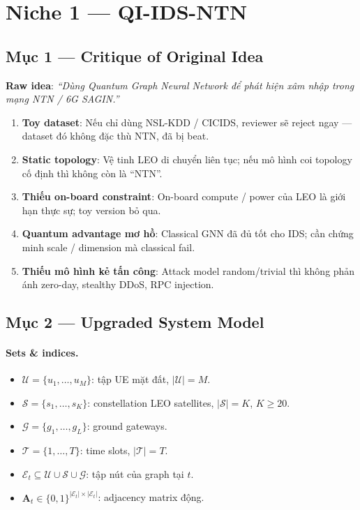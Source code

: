 \documentclass[11pt,a4paper]{article}
\begin{document}
\section{Niche 1 --- QI-IDS-NTN}

\subsection{Mục 1 --- Critique of Original Idea}

\textbf{Raw idea}: \textit{``Dùng Quantum Graph Neural Network để phát hiện xâm nhập trong mạng NTN / 6G SAGIN.''}

\begin{critique}
\begin{enumerate}
  \item \textbf{Toy dataset}: Nếu chỉ dùng NSL-KDD / CICIDS, reviewer sẽ reject ngay --- dataset đó không đặc thù NTN, đã bị beat.
  \item \textbf{Static topology}: Vệ tinh LEO di chuyển liên tục; nếu mô hình coi topology cố định thì không còn là ``NTN''.
  \item \textbf{Thiếu on-board constraint}: On-board compute / power của LEO là giới hạn thực sự; toy version bỏ qua.
  \item \textbf{Quantum advantage mơ hồ}: Classical GNN đã đủ tốt cho IDS; cần chứng minh scale / dimension mà classical fail.
  \item \textbf{Thiếu mô hình kẻ tấn công}: Attack model random/trivial thì không phản ánh zero-day, stealthy DDoS, RPC injection.
\end{enumerate}
\end{critique}

\subsection{Mục 2 --- Upgraded System Model}

\paragraph{Sets \& indices.}
\begin{itemize}
  \item $\mathcal{U} = \{u_1, \dots, u_M\}$: tập UE mặt đất, $|\mathcal{U}| = M$.
  \item $\mathcal{S} = \{s_1, \dots, s_K\}$: constellation LEO satellites, $|\mathcal{S}| = K$, $K \geq 20$.
  \item $\mathcal{G} = \{g_1, \dots, g_L\}$: ground gateways.
  \item $\mathcal{T} = \{1, \dots, T\}$: time slots, $|\mathcal{T}| = T$.
  \item $\mathcal{E}_t \subseteq \mathcal{U} \cup \mathcal{S} \cup \mathcal{G}$: tập nút của graph tại $t$.
  \item $\mathbf{A}_t \in \{0,1\}^{|\mathcal{E}_t|\times|\mathcal{E}_t|}$: adjacency matrix động.
\end{itemize}
\end{document}
